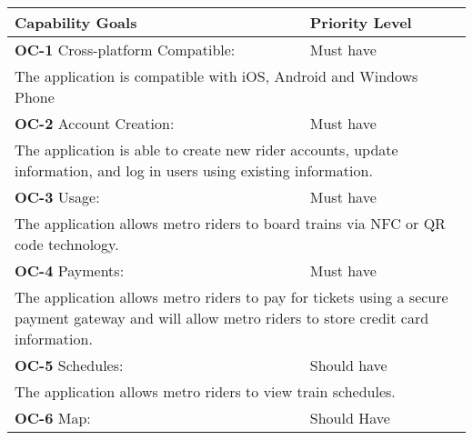 \begin{table}[h]
\begin{tabularx}{\textwidth}{Xl}
\toprule
Capability Goals                                                                             & Priority Level                                                           \\ \midrule
\textbf{OC-1} Cross-platform Compatible:                                                              & Must have                                                                \\
\multicolumn{2}{X}{The application is compatible with iOS, Android and Windows Phone}                                                                                   \\
\textbf{OC-2} Account Creation:                                                                       & Must have                                                                \\
\multicolumn{2}{X}{The application is able to create new rider accounts, update information, and log in users using existing information.}                              \\
\textbf{OC-3} Usage:                                                                                  & Must have                                                                \\
\multicolumn{2}{X}{The application allows metro riders to board trains via NFC or QR code technology.}                                                                  \\
\textbf{OC-4} Payments:                                                                               & Must have                                                                \\
\multicolumn{2}{X}{The application allows metro riders to pay for tickets using a secure payment gateway and will allow metro riders to store credit card information.} \\
\textbf{OC-5} Schedules:                                                                              & Should have                                                              \\
\multicolumn{2}{X}{The application allows metro riders to view train schedules.}                                                                                        \\
\textbf{OC-6} Map:                                                                                    & Should Have                                                              \\

\end{tabularx}
\end{table}
